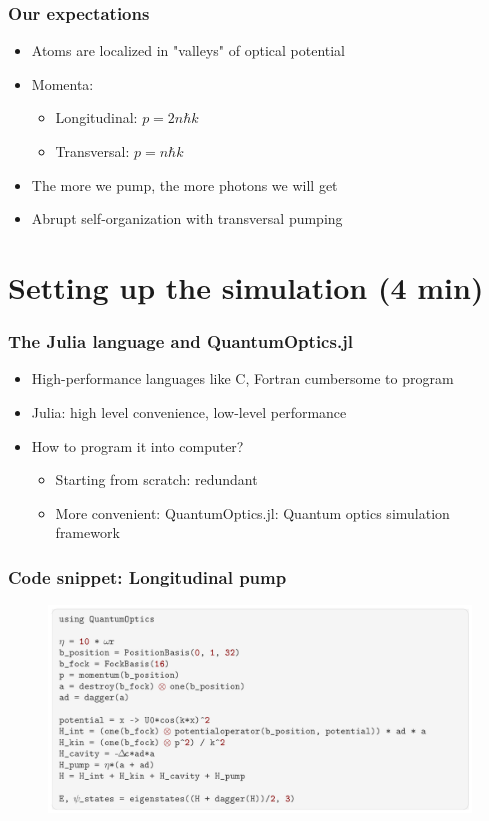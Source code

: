\documentclass[pdflatex,compress]{beamer}
\begin{document}
\begin{frame}
\frametitle{Our expectations}
\begin{itemize}
	\item Atoms are localized in "valleys" of optical potential
	\item Momenta:
		\begin{itemize}
			\item Longitudinal: $p = 2 n \hbar k$
			\item Transversal: $p = n \hbar k$
		\end{itemize}
	\item The more we pump, the more photons we will get
	\item Abrupt self-organization with transversal pumping
\end{itemize}
\end{frame}

\section{Setting up the simulation (4 min)}

\begin{frame}
\frametitle{The Julia language and QuantumOptics.jl}
\begin{itemize}
	\item High-performance languages like C, Fortran cumbersome to program
	\item Julia: high level convenience, low-level performance \cite{julialang}
	\item How to program it into computer?
	\begin{itemize}
		\item Starting from scratch: redundant
		\item More convenient: QuantumOptics.jl: Quantum optics simulation framework \cite{qojulia}	
	\end{itemize}
\end{itemize}
\end{frame}

\begin{frame}
\frametitle{Code snippet: Longitudinal pump}
\vspace{-2em}
\begin{figure}
\centering
\includegraphics[width=1\textwidth]{images/code_screenshot.png}
\end{figure}
\end{frame}
\end{document}
